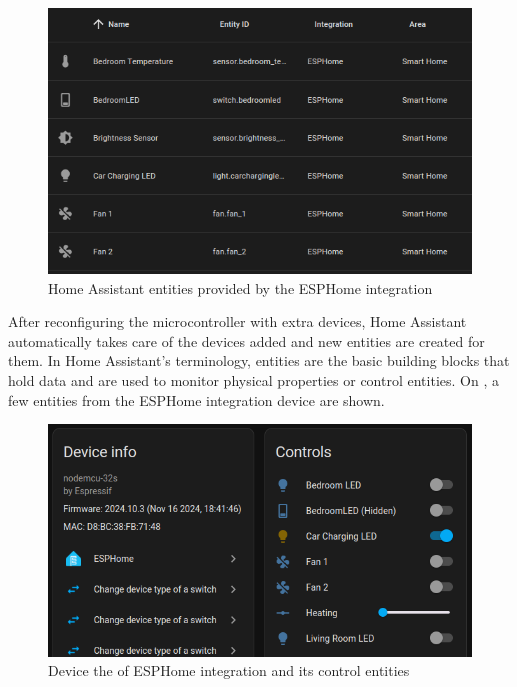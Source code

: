 \begin{figure}[!ht]
  \centering
  \includegraphics[width=150mm, keepaspectratio]{figures/esphome_entities.png}
  \caption{Home Assistant entities provided by the ESPHome integration}
  \label{fig:HAesphomeEntities}
\end{figure}

After reconfiguring the microcontroller with extra devices, Home Assistant automatically takes care of the devices added and new entities are created for them. In Home Assistant's terminology, entities are the basic building blocks that hold data and are used to monitor physical properties or control entities. \cite{HAConceptsTerminology} On , a few entities from the ESPHome integration device are shown. 

\begin{figure}[!ht]
  \centering
  \includegraphics[width=150mm, keepaspectratio]{figures/esphome_controls.png}
  \caption{Device the of ESPHome integration and its control entities}
  \label{fig:HAesphomeControls}
\end{figure}

